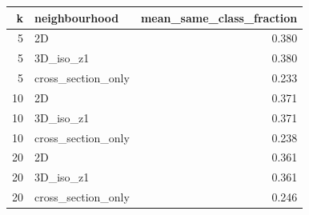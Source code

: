 \begin{tabular}{rlr}
\toprule
k & neighbourhood & mean_same_class_fraction \\
\midrule
5 & 2D & 0.380 \\
5 & 3D_iso_z1 & 0.380 \\
5 & cross_section_only & 0.233 \\
10 & 2D & 0.371 \\
10 & 3D_iso_z1 & 0.371 \\
10 & cross_section_only & 0.238 \\
20 & 2D & 0.361 \\
20 & 3D_iso_z1 & 0.361 \\
20 & cross_section_only & 0.246 \\
\bottomrule
\end{tabular}
